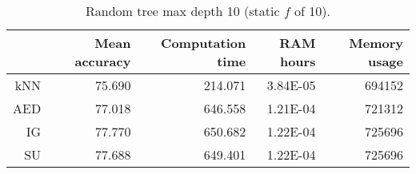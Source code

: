 \begin{table}[h]
\centering
\begin{tabular}{r|rrrr}
    & Mean accuracy & Computation time & RAM hours & Memory usage \\ \hline
kNN & 75.690                   & 214.071          & 3.84E-05  & 694152       \\
AED & 77.018                   & 646.558          & 1.21E-04  & 721312       \\
IG  & 77.770                   & 650.682          & 1.22E-04  & 725696       \\
SU  & 77.688                   & 649.401          & 1.22E-04  & 725696      
\end{tabular}
\caption{Random tree max depth 10 (static $f$ of 10).}
\label{Table:Tree}
\end{table}